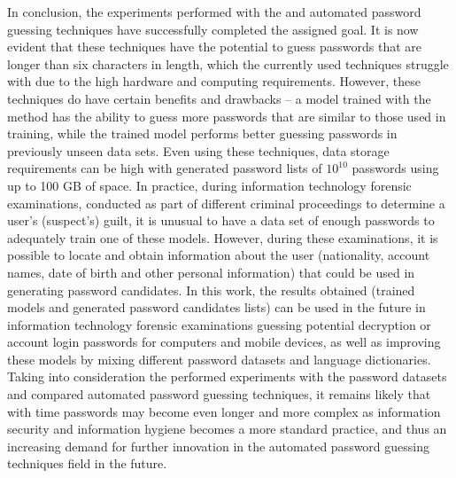 \documentclass{VUMIFInfBakalaurinis}
\begin{document}
In conclusion, the experiments performed with the  and 
 automated password guessing techniques have successfully 
completed the assigned goal. It is now evident that these techniques have the 
potential to guess passwords that are longer than six characters in length, 
which the currently used techniques struggle with due to the high hardware and 
computing requirements. However, these techniques do have certain benefits and 
drawbacks -- a model trained with the  method has the ability to 
guess more passwords that are similar to those used in training, while the 
 trained model performs better guessing passwords in 
previously unseen data sets. Even using these techniques, data storage 
requirements can be high with generated password lists of $10^{10}$ passwords 
using up to 100 GB of space. In practice, during information technology forensic 
examinations, conducted as part of different criminal proceedings to determine a 
user's (suspect's) guilt, it is unusual to have a data set of enough passwords 
to adequately train one of these models. However, during these examinations, it 
is possible to locate and obtain information about the user (nationality, 
account names, date of birth and other personal information) that could be used 
in generating password candidates. In this work, the results obtained (trained 
models and generated password candidates lists) can be used in the future in 
information technology forensic examinations guessing potential decryption or 
account login passwords for computers and mobile devices, as well as improving 
these models by mixing different password datasets and language dictionaries. 
Taking into consideration the performed experiments with the password datasets 
and compared automated password guessing techniques, it remains likely that with 
time passwords may become even longer and more complex as information security 
and information hygiene becomes a more standard practice, and thus an increasing 
demand for further innovation in the automated password guessing techniques 
field in the future.

\printbibliography[heading=bibintoc]

\appendix
\end{document}
